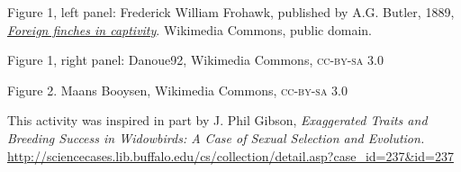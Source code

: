 \documentclass[12pt, hidelinks]{exam}
\newcommand*{\subsec}[1]{\medskip \bigskip {\scshape #1} \medskip}
\begin{document}
\subsec{Credits}

Figure 1, left panel: Frederick William Frohawk, published by A.G. Butler, 1889, \href{https://archive.org/details/foreignfinchesin00butlrich,}{\textit{Foreign finches in captivity}}. Wikimedia Commons, public domain.

Figure 1, right panel: Danoue92, Wikimedia Commons, \textsc{cc-by-sa 3.0}

Figure 2. Maans Booysen, Wikimedia Commons, \textsc{cc-by-sa 3.0}

This activity was inspired in part by J. Phil Gibson, \textit{Exaggerated Traits and Breeding Success in Widowbirds: A Case of Sexual Selection and Evolution.}\\ \href{http://sciencecases.lib.buffalo.edu/cs/collection/detail.asp?case_id=237&id=237}{http://sciencecases.lib.buffalo.edu/cs/collection/detail.asp?case\_id=237\&id=237}
\end{document}

